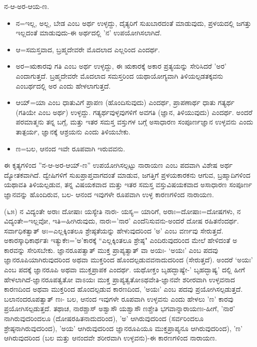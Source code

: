 ನ-ಆ-ಅರ-ಆಯ-ಣ.

\begin{itemize}
\item ನ=ಇಲ್ಲ, ಅಲ್ಲ, ಬೇಡ ಎಂಬ ಅರ್ಥ ಉಳ್ಳದ್ದು, ದೈತ್ಯರಿಗೆ ಸುಖಬಾರದಂತೆ ಮಾಡುವುದು, ಪ್ರಳಯದಲ್ಲಿ ಜಗತ್ತು ಇಲ್ಲದಂತೆ ಮಾಡುವುದು-ಈ ಅರ್ಥದಲ್ಲಿ 'ನ' ಉಪಯೋಗಿಸಲಾಗಿದೆ.

 \item ಆ=ಸಮಸ್ತವಾದ, ಬ್ರಹ್ಮದೇವರೇ ಮೊದಲಾದ ಎಲ್ಲರಿಂದ ಎಂದರ್ಥ.

 \item ಅರ=ಋಕಾರವು ಗತಿ ಎಂಬ ಅರ್ಥ ಉಳ್ಳದ್ದು, ಈ ಋಕಾರಕ್ಕೆ ಅಕಾರ ಪ್ರತ್ಯಯನ್ನು ಸೇರಿಸಿದರೆ 'ಅರ' ಎಂದಾಗುತ್ತದೆ. ಬ್ರಹ್ಮದೇವರೇ ಮೊದಲಾದ ಸಮಸ್ತರಿಂದ ಯಥಾಯೋಗ್ಯವಾಗಿ ತಿಳಿಯಲ್ಪಡತಕ್ಕವನು ಎಂಬರ್ಥದಲ್ಲಿ ಅರ ಎಂದು ಹೇಳಲಾಗುತ್ತದೆ.

 \item ಆಯ್=ಯಾ ಎಂಬ ಧಾತುವಿಗೆ ಪ್ರಾಪಣ (ಹೊಂದಿಸುವುದು) ಎಂದರ್ಥ, ಪ್ರಾಪಣಾರ್ಥ ಧಾತು ಗತ್ಯರ್ಥ (ಗತಿಯೇ ಎಂಬ ಅರ್ಥ) ಉಳ್ಳದ್ದು. ಗತ್ಯರ್ಥವುಳ್ಳವುಗಳಿಗೆ ಅವಗತಿ (ಜ್ಞಾನ, ತಿಳಿಯುವುದು) ಎಂದರ್ಥ. ಅಂದರೆ ಪರಮಾತ್ಮನು ತನ್ನ ಬಗ್ಗೆ, ಮತ್ತು ಇತರ ಸಮಸ್ತ ವಸ್ತುಗಳ ಬಗ್ಗೆ ಅಸಾಧಾರಣ ಸಂಪೂರ್ಣಜ್ಞಾನ ಉಳ್ಳವನು ಎಂದು ತಾತ್ಪರ್ಯ, ಜ್ಞಾನಕ್ಕೆ ಆಶ್ರಯನು ಎಂದು ತಿಳಿಯಬೇಕು.

 \item ಣ=ಬಲ, ಆನಂದ ಇವೇ ರೂಪವಾಗಿ ಇರುವವನು.

\end{itemize}

ಈ ಕೃತ್ಯಗಳಿಂದ ''ನ-ಆ-ಅರ-ಆಯ್-ಣ'' ಉಪಯೋಗಿಸಲ್ಪಟ್ಟು ನಾರಾಯಣ ಎಂಬ ಪದವಾಗಿ ವಿಶೇಷ ಅರ್ಥ ದ್ಯೋತಕವಾಗಿದೆ. ದ್ವೇಷಿಗಳಿಗೆ ಸುಖಪ್ರಾಪ್ತವಾಗದಂತೆ ಮಾಡುವ, ಜಗತ್ತಿಗೆ ಪ್ರಳಯಕಾರಕನು ಆಗುವ, ಬ್ರಹ್ಮಾದಿಗಳಿಂದ ಯಥಾವತಿ ತಿಳಿಯಲ್ಪಡುವ, ತನ್ನ ವಿಷಯಕವಾದ ಮತ್ತು ಇತರ ಸಮಸ್ತ ವಸ್ತುವಿಷಯಕವಾದ ಅಸಾಧಾರಣ ಸಂಪೂರ್ಣ ಜ್ಞಾನವನ್ನು ಹೊಂದಿರುವ, ಬಲ- ಆನಂದ ಇವುಗಳೇ ರೂಪವಾಗಿ ಉಳ್ಳ ಕಾರಣಗಳಿಂದ ನಾರಾಯಣ.

(೬೫) ನ ವಿದ್ಯಂತೇ ಅರಾಃ ದೋಷಾಃ ಯಸ್ಯೇತಿ ನಾರಃ- ಯಸ್ಯ= ಯಾರಿಗೆ, ಅರಾಃ=ದೋಷಾಃ=ದೋಷಗಳು, ನ ವಿದ್ಯಂತೇ=ಇಲ್ಲವೋ, ಇತಿ=ಹೀಗಿರುವುದು, ನಾರಃ='ನಾರ' ಎಂದೆನಿಸುವನು-ಅಂದರೆ ದೋಷ ರಹಿತನೆಂದರ್ಥ. ಸರ್ವಾಧಿಕತ್ವಾತ್ ಅಃ=ಎಲ್ಲಕ್ಕಿಂತಲೂ ಶ್ರೇಷ್ಠತೆಯನ್ನು ಹೇಳುವುದರಿಂದ 'ಅ' ಎಂಬ ವರ್ಣವು ಸೇರುತ್ತದೆ. ಅಕಾರಸ್ಕಾಧಿಕಾರ್ಥತಃ ಇತ್ಯುಕೇಃ='ಅ'ಕಾರಕ್ಕೆ ``ಎಲ್ಲಕ್ಕಿಂತಲೂ ಶ್ರೇಷ್ಠ" ಎಂದಿರುವುದರಿಂದ ಮೇಲೆ ಹೇಳಿದಂತೆ ಅ ಕಾರವನ್ನು ಸೇರಿಸಬೇಕು. ಜ್ಞಾನರೂಪತ್ವಾತ್ ಮುಕ್ತ ಪ್ರಾಪ್ಯತ್ವಾತ್ ವಾ ಅಯಃ- `ಅಯಃ' ಎಂಬ ಪದವು ಜ್ಞಾನರೂಪಿಯಾಗಿರುವುದರಿಂದ ಅಥವಾ ಮುಕ್ತರಿಂದ ಹೊಂದಲ್ಪಡುವವನಾದುದರಿಂದ (ಸೇರುತ್ತದೆ). ಅಂದರೆ `ಅಯಃ' ಎಂಬ ಪದಕ್ಕೆ ಜ್ಞಾನರೂಪಿ ಅಥವಾ ಮುಕ್ತಪ್ರಾಪಕ ಎಂದರ್ಥ. ಯಥೋಕ್ತಂ ಬೃಹದ್ಭಾಷ್ಯೇ-' ಬೃಹದ್ಭಾಷ್ಯ' ದಲ್ಲಿ ಹೀಗೆ ಹೇಳಲಾಗಿದೆ-ಜ್ಞಾನರೂಪತ್ವತೋ ವಾಽಯಃ ಮುಕ್ತ ಪ್ರಾಪ್ಯತ್ವತೋಽಥವೇತಿ-ಜ್ಞಾನವೇ ಶರೀರವಾಗಿ ಉಳ್ಳವನಾದ ಕಾರಣದಿಂದ ಅಥವಾ ಮುಕ್ತರಿಂದ ಹೊಂದಲ್ಪಡುವ ಕಾರಣದಿಂದ, 'ಅಯಃ' ಎಂಬ ಪದವು ಪ್ರಯೋಗಿಸಲ್ಪಡುತ್ತದೆ. ಬಲಾನಂದರೂಪತ್ವಾತ್ ಣಃ- ಬಲ, ಆನಂದ ಇವುಗಳೇ ರೂಪವಾಗಿ ಉಳ್ಳವನು ಎಂದು ಹೇಳಲು 'ಣ' ಕಾರವು ಪ್ರಯೋಗಿಸಲ್ಪಡುತ್ತದೆ. ತಥಾಚ, ನಾರಶ್ಚಾಸ್‌ ಅಶ್ವಾಸೌ ಯಶ್ವಾಸೌ ಣಶ್ಚೇತಿ ಭಗವಾನ್ನಾರಾಯಣಃ-ಹೀಗೆ, 'ನಾರ' ನಾಗಿರುವುದರಿಂದಲೂ (ದೋಷರಹಿತನಾದುದರಿಂದ), 'ಅ' ಆಗಿರುವುದರಿಂದ (ಸರ್ವರಿಂದಲೂ ಶ್ರೇಷ್ಠನಾಗಿರುವುದರಿಂದ), 'ಅಯ' ಆಗಿರುವುದರಿಂದ ಜ್ಞಾನರೂಪಿಯೂ ಮುಕ್ತಪ್ರಾಪ್ಯನೂ ಆಗಿರುವುದರಿಂದ), 'ಣ' ಆಗಿರುವುದರಿಂದ (ಬಲ ಮತ್ತು ಆನಂದವೇ ಶರೀರವಾಗಿ ಉಳ್ಳವನು)-ಈ ಕಾರಣಗಳಿಂದ ನಾರಾಯಣ.

